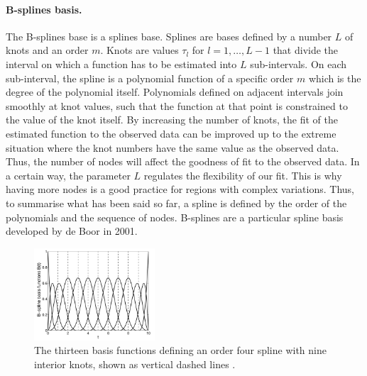 \paragraph{B-splines basis.} The B-splines base is a splines base. Splines are bases defined by a number $L$ of knots and an order $m$. Knots are values $\tau_l$ for $l=1,\dots,L-1$ that divide the interval on which a function has to be estimated into $L$ sub-intervals. On each sub-interval, the spline is a polynomial function of a specific order $m$ which is the degree of the polynomial itself. Polynomials defined on adjacent intervals join smoothly at knot values, such that the function at that point is constrained to the value of the knot itself. By increasing the number of knots, the fit of the estimated function to the observed data can be improved up to the extreme situation where the knot numbers have the same value as the observed data. Thus, the number of nodes will affect the goodness of fit to the observed data. In a certain way, the parameter $L$ regulates the flexibility of our fit. This is why having more nodes is a good practice for regions with complex variations. Thus, to summarise what has been said so far, a spline is defined by the order of the polynomials and the sequence of nodes. B-splines are a particular spline basis developed by de Boor in 2001. 
\begin{figure}
\centering
\includegraphics[width=0.4\textwidth]{Images/bspline.png}
\caption[Bsplines fitting.]{The thirteen basis functions defining an order four spline with nine interior knots, shown as vertical dashed lines \cite{ramsay_functional_2006}.}
\label{fig:bspline_13}
\end{figure}

